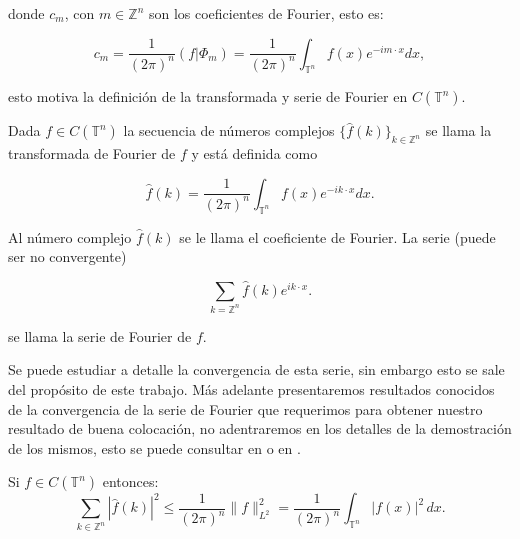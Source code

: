 \documentclass[12pt]{article}
\newcommand\Z{\ensuremath{\mathbb{Z}}}
\newcommand\T{\mathbb{T}}
\renewcommand{\hat}{\widehat}
\begin{document}
donde $c_m$, con $m\in \Z^n$ son los coeficientes de Fourier, esto es:

$$c_m=\dfrac{1}{(2\pi)^n}\left(f|\Phi_m\right)=\dfrac{1}{(2\pi)^n}\int_{\T^n}f(x)e^{-im\cdot x} dx,$$

esto motiva la definición de la transformada y serie de Fourier en $C(\T^n)$.


\begin{definition}
Dada $f \in C(\T^n)$ la secuencia de números complejos $\{\widehat{f}(k)\}_{k \in \mathbb{Z}^n}$ se llama la transformada de Fourier de $f$ y está definida como

$$
\widehat{f}(k)=\frac{1}{(2 \pi)^n} \int_{\T^n} f(x) e^{-i k \cdot x} d x.
$$


Al número complejo $\widehat{f}(k)$ se le llama el coeficiente de Fourier.
La serie (puede ser no convergente)

$$
\sum_{k=\Z^n} \widehat{f}(k) e^{i k \cdot x}.
$$

se llama la serie de Fourier de $f$.
\end{definition}

Se puede estudiar a detalle la convergencia de esta serie, sin embargo esto se sale del propósito de este trabajo. Más adelante presentaremos resultados conocidos de la convergencia de la serie de Fourier que requerimos para obtener nuestro resultado de buena colocación, no adentraremos en los detalles de la demostración de los mismos, esto se puede consultar en \cite{grafakos2008classical} o en \cite{iorio2001fourier}.

\begin{theorem}\label{bessel}
Si $f \in C (\T^{n})$ entonces:
$$\sum_{k \in \mathbb{Z}^n} | \hat{f}(k) |^2 \leq \frac{1}{(2\pi)^n} \| f \|_{L^2}^2 = \frac{1}{(2\pi)^n} \int_{\T^n} |f(x)|^2 \, dx.$$
\end{theorem}
\end{document}
